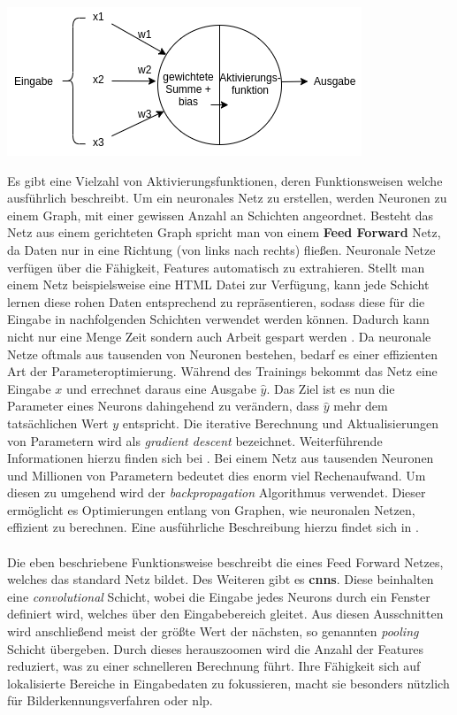 \documentclass[
    12pt, %
    DIV10,
    ngerman, %
    a4paper, %
    oneside, %
    titlepage, %
    parskip=half, %
    headings=normal, %
    listof=totoc, %
    bibliography=totoc, %
    index=totoc, %
    captions=tableheading, %
    final %
]{scrreprt}
\begin{document}
\begin{center}
\includegraphics[scale=0.6]{img/neuron.png}
\label{fig:neuron}
\end{center}
Es gibt eine Vielzahl von Aktivierungsfunktionen, deren Funktionsweisen welche \textcite{JoshuaSaxe2018} ausführlich beschreibt. Um ein neuronales Netz zu erstellen, werden Neuronen zu einem Graph, mit einer gewissen Anzahl an Schichten angeordnet. Besteht das Netz aus einem gerichteten Graph spricht man von einem \textbf{Feed Forward} Netz, da Daten nur in eine Richtung (von links nach rechts) flie{\ss}en. Neuronale Netze verfügen über die Fähigkeit, Features automatisch zu extrahieren. Stellt man einem Netz beispielsweise eine HTML Datei zur Verfügung, kann jede Schicht lernen diese rohen Daten entsprechend zu repräsentieren, sodass diese für die Eingabe in nachfolgenden Schichten verwendet werden können. Dadurch kann nicht nur eine Menge Zeit sondern auch Arbeit gespart werden \parencite{JoshuaSaxe2018}. Da neuronale Netze oftmals aus tausenden von Neuronen bestehen, bedarf es einer effizienten Art der Parameteroptimierung. Während des Trainings bekommt das Netz eine Eingabe $x$ und errechnet daraus eine Ausgabe $\hat{y}$. Das Ziel ist es nun die Parameter eines Neurons dahingehend zu verändern, dass $\hat{y}$ mehr dem tatsächlichen Wert $y$ entspricht. Die iterative Berechnung und Aktualisierungen von Parametern wird als \emph{gradient descent} bezeichnet. Weiterführende Informationen hierzu finden sich bei \textcite{bonaccorso2018python}. Bei einem Netz aus tausenden Neuronen und Millionen von Parametern bedeutet dies enorm viel Rechenaufwand. Um diesen zu umgehend wird der \emph{backpropagation} Algorithmus verwendet. Dieser ermöglicht es Optimierungen entlang von Graphen, wie neuronalen Netzen, effizient zu berechnen. Eine ausführliche Beschreibung hierzu findet sich in \textcite{krohn2019deep}.\\\\
Die eben beschriebene Funktionsweise beschreibt die eines Feed Forward Netzes, welches das standard Netz bildet. Des Weiteren gibt es \textbf{\ac{cnns}}. Diese beinhalten eine \emph{convolutional} Schicht, wobei die Eingabe jedes Neurons durch ein Fenster definiert wird, welches über den Eingabebereich gleitet. Aus diesen Ausschnitten wird anschlie{\ss}end meist der grö{\ss}te Wert der nächsten, so genannten \emph{pooling} Schicht übergeben. Durch dieses herauszoomen wird die Anzahl der Features reduziert, was zu einer schnelleren Berechnung führt. Ihre Fähigkeit sich auf lokalisierte Bereiche in Eingabedaten zu fokussieren, macht sie besonders nützlich für Bilderkennungsverfahren oder \ac{nlp}.\\\\
\end{document}
